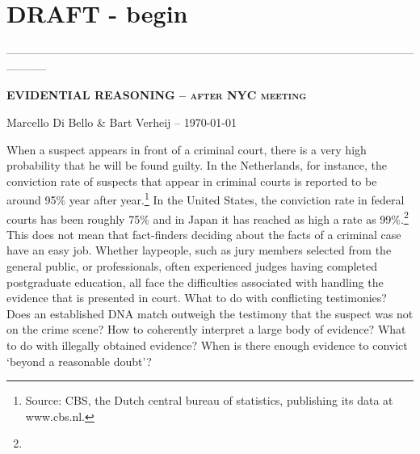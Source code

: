 \documentclass[10pt]{article}
\begin{document}
\thispagestyle{empty}

\vspace{-2cm}
\noindent
\section*{ \hspace{6cm} \Large DRAFT - begin}
-----------------------------------------------------------------------------------------------------------------------


\vspace{5mm}
\noindent
\textsc{\large \bf  EVIDENTIAL REASONING -- after NYC meeting}

\vspace{3mm}
\noindent
Marcello Di Bello \& Bart Verheij --  \today \\
\vspace{1cm}

\vspace{1cm}



\vspace{1cm}



\tableofcontents

\newpage

When a suspect appears in front of a criminal court, there is a very high probability that he will be found guilty. In the Netherlands, for instance, the conviction rate of suspects that appear in criminal courts is reported to be around 95\% year after year.\footnote{Source: CBS, the Dutch central bureau of statistics, publishing its data at www.cbs.nl.} In the United States, the conviction rate in federal courts has been roughly 75\% and in Japan it has reached as high a rate as 99\%.\footnote{} This does not mean that fact-finders deciding about the facts of a criminal case have an easy job. Whether laypeople, such as jury members selected from the general public, or professionals, often experienced judges having completed postgraduate education, all face the difficulties associated with handling the evidence that is presented in court. What to do with conflicting testimonies? Does an established DNA match outweigh the testimony that the suspect was not on the crime scene? How to coherently interpret a large body of evidence? What to do with illegally obtained evidence? When is there enough evidence to convict `beyond a reasonable doubt'? 
\end{document}
